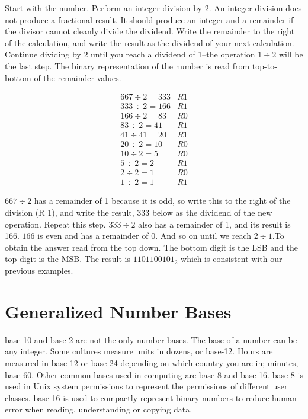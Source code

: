 Start with the number. Perform an integer division by 2. An integer division does not produce a fractional result. It should produce an integer and a remainder if the divisor cannot cleanly divide the dividend. Write the remainder to the right of the calculation, and write the result as the dividend of your next calculation. Continue dividing by 2 until you reach a dividend of 1--the operation $1 \div 2$ will be the last step. The binary representation of the number is read from top-to-bottom of the remainder values.

\begin{align*}
	667 \div 2 = 333  	& R 1 \\
	333 \div 2 = 166 	& R 1 \\
	166 \div 2 = 83 	& R 0 \\
	83  \div 2 = 41 	& R 1 \\
	41	\div 41 = 20 	& R 1 \\
	20 \div 2 = 10 		& R 0 \\
	10 \div 2 = 5 		& R 0 \\
	5 \div 2 = 2 		& R 1 \\
	2 \div 2 = 1 		& R 0 \\
	1 \div 2 = 1		& R 1
\end{align*}

$667 \div 2$ has a remainder of 1 because it is odd, so write this to the right of the division (R 1), and write the result, $333$ below as the dividend of the new operation. Repeat this step. $333 \div 2$ also has a remainder of 1, and its result is 166. $166$ is even and has a remainder of 0. And so on until we reach $2 \div 1$.To obtain the answer read from the top down. The bottom digit is the LSB and the top digit is the MSB. The result is $1101100101_2$ which is consistent with our previous examples.

\section{Generalized Number Bases\label{sec:numbers:bases}}

\Gls{base-10} and \gls{base-2} are not the only number bases. The base of a number can be any 
integer. Some cultures measure units in dozens, or base-12. Hours are measured in base-12 or 
base-24 depending on which country you are in; minutes, base-60. Other common bases used in 
computing are \gls{base-8} and \gls{base-16}. \Gls{base-8} is used in Unix system permissions 
to represent the permissions of different user classes. \Gls{base-16} is used to compactly 
represent binary numbers to reduce human error when reading, understanding or copying data.

